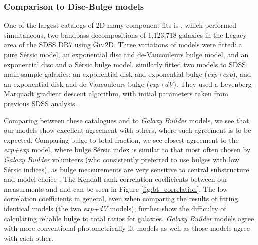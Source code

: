 \documentclass[../main.tex]{subfiles}
\begin{document}
\subsubsection{Comparison to Disc-Bulge models}

One of the largest catalogs of 2D many-component fits is \citet{Simard2011:1107.1518v1}, which performed simultaneous, two-bandpass decompositions of 1,123,718 galaxies in the Legacy area of the SDSS DR7 using \textsc{Gim2D}. Three variations of models were fitted: a pure S\'ersic model, an exponential disc and de-Vaucouleurs bulge model, and an exponential disc and a S\'ersic bulge model. \citet{2012MNRAS.421.2277L} similarly fitted two models to SDSS main-sample galaxies: an exponential disk and exponential bulge (\textit{exp+exp}), and an exponential disk and de Vaucouleurs bulge (\textit{exp+dV}). They used a Levenberg-Marquadt gradient descent algorithm, with initial parameters taken from previous SDSS analysis.

Comparing between these catalogues and to \textit{Galaxy Builder} models, we see that our models show excellent agreement with others, where such agreement is to be expected. Comparing bulge to total fraction, we see closest agreement to the \textit{exp+exp} model, where bulge S\'ersic index is similar to that most often chosen by \textit{Galaxy Builder} volunteers (who consistently preferred to use bulges with low S\'ersic indices), as bulge measurements are very sensitive to central substructure and model choice \citep{Gao2017:1709.00746v1}. The Kendall rank correlation coefficients between our measurments and \citet{Simard2011:1107.1518v1} and \citet{2012MNRAS.421.2277L} can be seen in Figure \ref{fig:bt_correlation}. The low correlation coefficients in general, even when comparing the results of fitting identical models (the two \textit{exp+dV} models), further show the difficulty of calculating reliable bulge to total ratios for galaxies. \textit{Galaxy Builder} models agree with more conventional photometrically fit models as well  as those models agree with each other.



\end{document}
